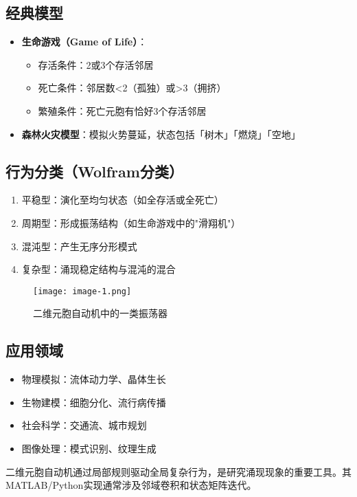 \documentclass[forprint]{WHUBachelor}
\begin{document}
\subsection{经典模型}
\begin{itemize}
    \item \textbf{生命游戏（Game of Life）}：
    \begin{itemize}
        \item 存活条件：2或3个存活邻居
        \item 死亡条件：邻居数<2（孤独）或>3（拥挤）
        \item 繁殖条件：死亡元胞有恰好3个存活邻居
    \end{itemize}
    \item \textbf{森林火灾模型}：模拟火势蔓延，状态包括「树木」「燃烧」「空地」
\end{itemize}

\subsection{行为分类（Wolfram分类）}
\begin{enumerate}
    \item 平稳型：演化至均匀状态（如全存活或全死亡）
    \item 周期型：形成振荡结构（如生命游戏中的"滑翔机"）
    \item 混沌型：产生无序分形模式
    \item 复杂型：涌现稳定结构与混沌的混合
\end{enumerate}
\begin{figure}[h]
    \centering
    \texttt{[image: image-1.png]}
    \caption{二维元胞自动机中的一类振荡器}
    \label{fig:gui}
\end{figure}

\subsection{应用领域}
\begin{itemize}
    \item 物理模拟：流体动力学、晶体生长
    \item 生物建模：细胞分化、流行病传播
    \item 社会科学：交通流、城市规划
    \item 图像处理：模式识别、纹理生成
\end{itemize}

二维元胞自动机通过局部规则驱动全局复杂行为，是研究涌现现象的重要工具。其MATLAB/Python实现通常涉及邻域卷积和状态矩阵迭代。
\end{document}
